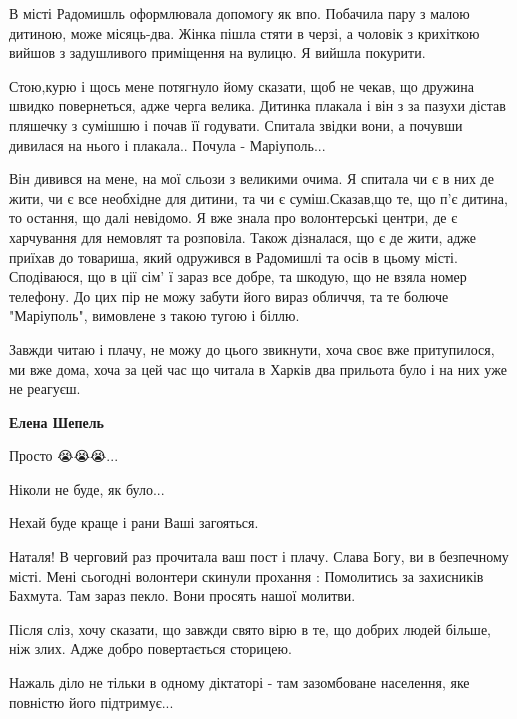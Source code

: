 В місті Радомишль оформлювала допомогу як впо. Побачила пару з малою дитиною,
може місяць-два. Жінка пішла стяти в черзі, а чоловік з крихіткою вийшов з
задушливого приміщення на вулицю. Я вийшла покурити.

Стою,курю і щось мене потягнуло йому сказати, щоб не чекав, що дружина швидко
повернеться, адже черга велика. Дитинка плакала і він з за пазухи дістав
пляшечку з сумішшю і почав її годувати. Спитала звідки вони, а почувши дивилася
на нього і плакала.. Почула - Маріуполь...

Він дивився на мене, на мої сльози з великими очима. Я спитала чи є в них де
жити, чи є все необхідне для дитини, та чи є суміш.Сказав,що те, що п'є дитина,
то остання, що далі невідомо. Я вже знала про волонтерські центри, де є
харчування для немовлят та розповіла. Також дізналася, що є де жити, адже
приїхав до товариша, який одружився в Радомишлі та осів в цьому місті.
Сподіваюся, що в ції сім' ї зараз все добре, та шкодую, що не взяла номер
телефону. До цих пір не можу забути його вираз обличчя, та те болюче
"Маріуполь", вимовлене з такою тугою і біллю.


Завжди читаю і плачу, не можу до цього звикнути, хоча своє вже притупилося,
ми вже дома, хоча за цей час що читала в Харків два прильота було і на них уже
не реагуєш.

\begin{itemize} %
\textbf{Елена Шепель}
\end{itemize} %


Просто 😭😭😭...

Ніколи не буде, як було...

Нехай буде краще і рани Ваші загояться.


Наталя! В черговий раз прочитала ваш пост і плачу. Слава Богу, ви в безпечному
місті. Мені сьогодні волонтери скинули прохання : Помолитись за захисників
Бахмута. Там зараз пекло. Вони просять нашої молитви.


Після сліз, хочу сказати, що завжди свято вірю в те, що добрих людей більше,
ніж злих. Адже добро повертається сторицею.


Нажаль діло не тільки в одному діктаторі - там зазомбоване населення, яке
повністю його підтримує...

